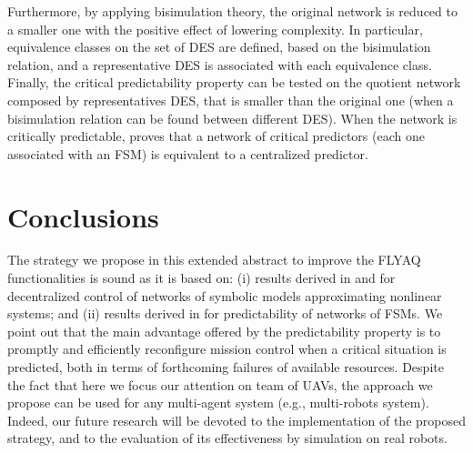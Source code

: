 \documentclass[letterpaper, 10 pt, conference]{ieeeconf}
\begin{document}
%
Furthermore, by applying bisimulation theory, the original network is reduced to a smaller one with the positive effect of lowering complexity. 
%
In particular, equivalence classes on the set of DES are defined, based on the bisimulation relation, and a representative DES is associated with each equivalence class. Finally, the critical predictability property can be tested on the quotient network composed by representatives DES, that is smaller than the original one (when a bisimulation relation can be found between different DES). When the network is critically predictable, \cite{LCSS18} proves that a network of critical predictors (each one associated with an FSM) is equivalent to a centralized predictor.


\section{Conclusions}\label{sec:Conclusion}
The strategy we propose in this extended abstract to improve the FLYAQ functionalities is sound as it is based on: (i) results derived in \cite{Pola:TAC2016} and \cite{Pola:Decentralized} for decentralized control of networks of symbolic models approximating nonlinear systems; and (ii) results derived in \cite{LCSS18} for predictability of networks of FSMs. We point out that the main advantage offered by the predictability property is to promptly and efficiently reconfigure mission control when a critical situation is predicted, both in terms of forthcoming failures of available resources.
Despite the fact that here we focus our attention on team of UAVs, the approach we propose can be used for any multi-agent system (e.g., multi-robots system).
Indeed, our future research will be devoted to the implementation of the proposed strategy, and to the evaluation of its effectiveness by simulation on real robots.



\end{document}
